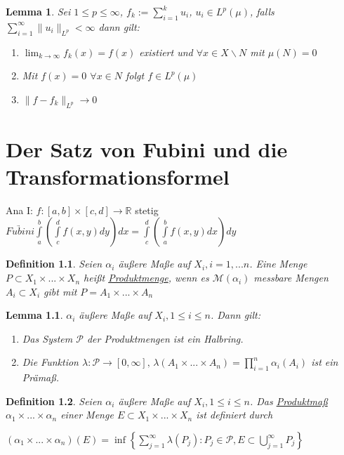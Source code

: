 \documentclass[11pt]{memoir}
\theoremstyle{changebreak}
\newtheorem{Definition}{Definition}[chapter]
\newtheorem{Lemma}{Lemma}[chapter]
\begin{document}
\begin{Lemma}
Sei $1 \leq p \leq \infty$, $f_k := \sum\limits_{i=1}^k u_i$, $u_i \in L^p(\mu)$, falls $\sum\limits_{i=1}^\infty \|u_i\|_{L^p} < \infty$ dann gilt:
\begin{enumerate}
	\item $\lim_{k \rightarrow \infty} f_k (x) = f(x)$ existiert und $\forall x \in X\backslash N$ mit $\mu(N) =0$
	\item Mit $f(x) = 0$ $\forall x \in N$ folgt $f \in L^p(\mu)$
	\item $\|f-f_k\|_{L^p} \rightarrow 0$
\end{enumerate}

\end{Lemma}





\newpage
\chapter{Der Satz von Fubini und die Transformationsformel}
Ana I: $f: [a, b] \times [c, d] \rightarrow \mathbb R$ stetig \\
$\underrightarrow{Fubini} \int\limits_a^b \left( \int\limits_c^d f(x, y) dy\right) dx = \int\limits_c^d \left( \int\limits_a^b f(x, y) dx \right) dy$

\begin{Definition}
Seien $\alpha_i$ äußere Maße auf $X_i, i = 1, ... n$. Eine Menge $P \subset X_1 \times ... \times X_n$ heißt \underline{Produktmenge}, wenn es $\mathscr M(\alpha_i)$ messbare Mengen $A_i \subset X_i$ gibt mit $P = A_1 \times ... \times A_n$
\end{Definition}

\begin{Lemma}
$\alpha_i$ äußere Maße auf $X_i, 1 \leq i \leq n$. Dann gilt:
\begin{enumerate}
	\item Das System $\mathscr P$ der Produktmengen ist ein Halbring.
	\item Die Funktion $\lambda: \mathscr P \rightarrow [0, \infty], \, \lambda(A_1 \times ... \times A_n) = \prod\limits_{i=1}^n \alpha_i(A_i)$ ist ein Prämaß.
\end{enumerate}
\end{Lemma}

\begin{Definition}
Seien $\alpha_i$ äußere Maße auf $X_i, 1 \leq i \leq n$. Das \underline{Produktmaß} $\alpha_1 \times ... \times \alpha_n$ einer Menge $E \subset X_1 \times ... \times X_n$ ist definiert durch
\begin{center}
	$(\alpha_1 \times ... \times \alpha_n)(E) = \inf\left\{ \sum\limits_{j=1}^\infty \lambda(P_j): P_j \in \mathscr P, E \subset \bigcup\limits_{j=1}^\infty P_j \right\}$

\end{center}
\end{Definition}
\end{document}

